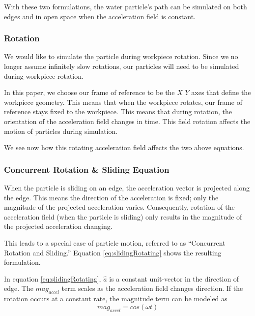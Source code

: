 

With these two formulations, the water particle's path can be simulated on both edges and in open space when the acceleration field is constant.

		\subsubsection{Rotation}

We would like to simulate the particle during workpiece rotation. Since we no longer assume infinitely slow rotations, our particles will need to be simulated during workpiece rotation.

In this paper, we choose our frame of reference to be the $X$ $Y$ axes that define the workpiece geometry. This means that when the workpiece rotates, our frame of reference stays fixed to the workpiece. This means that during rotation, the orientation of the acceleration field changes in time. This field rotation affects the motion of particles during simulation.

We see now how this rotating acceleration field affects the two above equations.

		\subsubsection{Concurrent Rotation \& Sliding Equation}

When the particle is sliding on an edge, the acceleration vector is projected along the edge. This means the direction of the acceleration is fixed; only the magnitude of the projected acceleration varies. Consequently, rotation of the acceleration field (when the particle is sliding) only results in the magnitude of the projected acceleration changing.

This leads to a special case of particle motion, referred to as ``Concurrent Rotation and Sliding.'' Equation \eqref{eq:slidingRotating} shows the resulting formulation.

 {
	\label{eq:slidingRotating}
}

In equation \eqref{eq:slidingRotating}, $\hat{a}$ is a constant unit-vector in the direction of edge. The $mag_{accel}$ term scales as the acceleration field changes direction. If the rotation occurs at a constant rate, the magnitude term can be modeled as
$$
mag_{accel} = cos(\omega t)
$$

